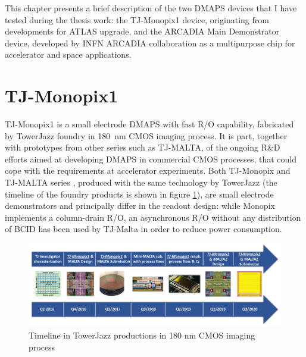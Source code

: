 This chapter presents a brief description of the two DMAPS devices that I have tested during the thesis work: the TJ-Monopix1 device, originating from developments for ATLAS upgrade, and the ARCADIA Main Demonstrator device, developed by INFN ARCADIA collaboration as a multipurpose chip for accelerator and space applications.

\section{TJ-Monopix1}
TJ-Monopix1 is a small electrode DMAPS with fast R/O capability, fabricated by TowerJazz foundry in \SI{180}{nm} CMOS imaging process.
It is part, together with prototypes from other series such as TJ-MALTA, of the ongoing R$\&$D efforts aimed at developing DMAPS in commercial CMOS processes, that could cope with the requirements at accelerator experiments.
Both TJ-Monopix and TJ-MALTA series \cite{MALTA}, produced with the same technology by TowerJazz (the timeline of the foundry products is shown in figure \ref{fig:TJ180nm}), are small electrode demonstrators and principally differ in the readout design: while Monopix implements a column-drain R/O, an asynchronous R/O without any distribution of BCID has been used by TJ-Malta in order to reduce power consumption.

\begin{figure}[h!]
    \centering
    \includegraphics[width=.95\linewidth]{figures/Monopix1/TJ180nm.png}
    \caption{Timeline in TowerJazz productions in 180 nm CMOS imaging process}
    \label{fig:TJ180nm}
\end{figure} 

